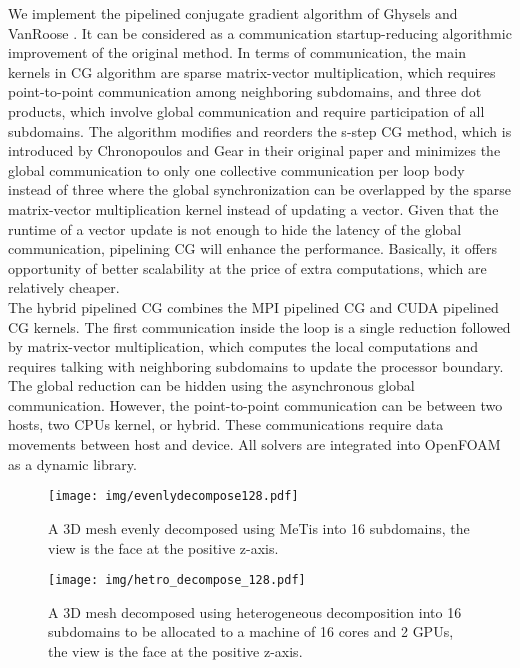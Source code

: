 \documentclass[3p,times]{elsarticle}
\begin{document}
We implement the pipelined conjugate gradient algorithm of Ghysels and VanRoose \cite{pipecg}. It can be considered as a communication startup-reducing algorithmic improvement of the original method. In terms of communication, the main kernels in CG algorithm are sparse matrix-vector multiplication, which requires point-to-point communication among neighboring subdomains, and three dot products, which involve global communication and require participation of all subdomains. The algorithm modifies and reorders the s-step CG method, which is introduced by Chronopoulos and Gear in their original paper \cite{s_step} and minimizes the global communication to only one collective communication per loop body instead of three where the global synchronization can be overlapped by the sparse matrix-vector multiplication kernel instead of updating a vector. Given that the runtime of a vector update is not enough to hide the latency of the global communication, pipelining CG will enhance the performance. Basically, it offers opportunity of better scalability at the price of extra computations, which are relatively cheaper. \\

The hybrid pipelined CG combines the MPI pipelined CG and CUDA pipelined CG kernels. The first communication inside the loop is a single reduction followed by matrix-vector multiplication, which computes the local computations and requires talking with neighboring subdomains to update the processor boundary. The global reduction can be hidden using the asynchronous global communication. However, the point-to-point communication can be between two hosts, two CPUs kernel, or hybrid. These communications require data movements between host and device. All solvers are integrated into OpenFOAM as a dynamic library. \\ 
\begin{figure}[t]
\begin{center}
\texttt{[image: img/evenlydecompose128.pdf]} 
\caption{ A  3D mesh evenly decomposed using MeTis into 16 subdomains, the view is the face at the positive z-axis.}
\label{pic_evenDecom}
\end{center}
\end{figure}

\begin{figure}[h]
\begin{center}
\texttt{[image: img/hetro\_decompose\_128.pdf]} 
\caption{ A  3D mesh decomposed using heterogeneous decomposition into 16 subdomains to be allocated to a machine of 16 cores and 2 GPUs, the view is the face at the positive z-axis.}
\label{pic_hetroDecom}
\end{center}
\end{figure}
\end{document}

